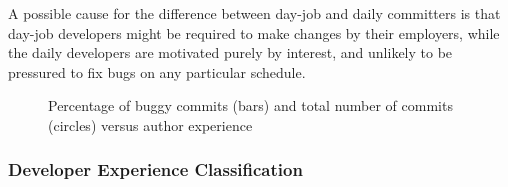 A possible cause for the difference between day-job and daily committers is that
day-job developers might be required to make changes by their employers, while
the daily developers are motivated purely by interest, and unlikely to be
pressured to fix bugs on any particular schedule.

\begin{figure}[tbh]
\centering
{}
\caption{\label{fig-bugginess-experience}Percentage of buggy commits (bars) and total number of commits (circles) versus author experience}
\end{figure}

\subsubsection{Developer Experience Classification}
\label{sec-dev-exp}

